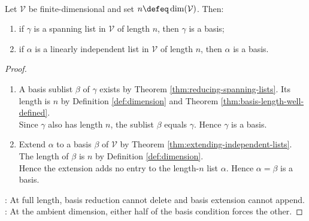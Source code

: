 \begin{proposition} \label{prop:full-dimension-basis-criteria} \\
Let $\mathcal{V}$ be finite-dimensional and set $n\defeq\dim(\mathcal{V})$. Then:
\begin{enumerate}[label=(\roman*)]
\setlength{\itemsep}{0pt}
\item if $\gamma$ is a spanning list in $\mathcal{V}$ of length $n$, then $\gamma$ is a basis;
\item if $\alpha$ is a linearly independent list in $\mathcal{V}$ of length $n$, then $\alpha$ is a basis.
\end{enumerate}
\begin{proof}
\begin{enumerate}[label=(\roman*)]
\setlength{\itemsep}{0pt}
\item[$(i)$] A basis sublist $\beta$ of $\gamma$ exists by Theorem \ref{thm:reducing-spanning-lists}. Its length is $n$ by Definition \ref{def:dimension} and Theorem \ref{thm:basis-length-well-defined}.\\
Since $\gamma$ also has length $n$, the sublist $\beta$ equals $\gamma$. Hence $\gamma$ is a basis.
\item[$(ii)$] Extend $\alpha$ to a basis $\beta$ of $\mathcal{V}$ by Theorem \ref{thm:extending-independent-lists}. The length of $\beta$ is $n$ by Definition \ref{def:dimension}.\\
Hence the extension adds no entry to the length-$n$ list $\alpha$. Hence $\alpha=\beta$ is a basis.
\end{enumerate}
: At full length, basis reduction cannot delete and basis extension cannot append.\\
: At the ambient dimension, either half of the basis condition forces the other.
\end{proof}
\end{proposition}

